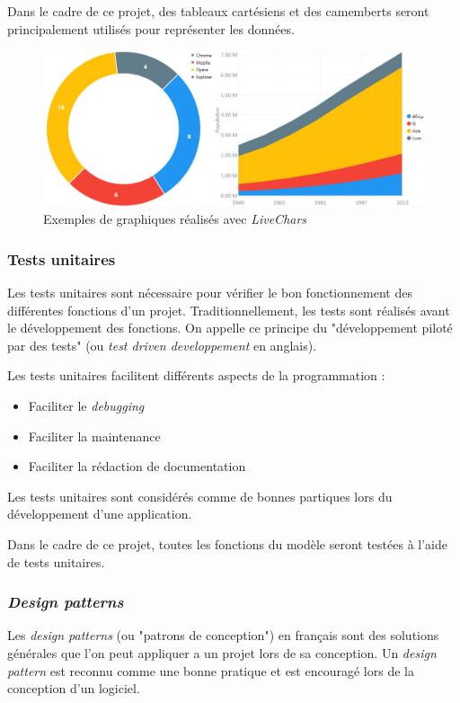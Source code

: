 \documentclass[a4paper]{article}
\begin{document}
Dans le cadre de ce projet, des tableaux cartésiens et des camemberts seront principalement utilisés pour représenter les données.

\vspace{0.5cm}
\begin{figure}[htp]
    \centering
    \includegraphics[width=\linewidth]{charts.png}
    \caption{Exemples de graphiques réalisés avec \textit{LiveChars}}
\end{figure}

\subsubsection{Tests unitaires}
Les tests unitaires sont nécessaire pour vérifier le bon fonctionnement des différentes fonctions d'un projet. Traditionnellement, les tests sont réalisés avant le développement des fonctions. On appelle ce principe du "développement piloté par des tests" (ou \textit{test driven developpement} en anglais). 

Les tests unitaires facilitent différents aspects de la programmation : 
\begin{itemize}
    \item Faciliter le \textit{debugging}
    \item Faciliter la maintenance
    \item Faciliter la rédaction de documentation
\end{itemize}

Les tests unitaires sont considérés comme de bonnes partiques lors du développement d'une application.

Dans le cadre de ce projet, toutes les fonctions du modèle seront testées à l'aide de tests unitaires.

\pagebreak
\subsubsection{\textit{Design patterns}}
Les \textit{design patterns} (ou "patrons de conception") en français sont des solutions générales que l'on peut appliquer a un projet lors de sa conception. Un \textit{design pattern} est reconnu comme une bonne pratique et est encouragé lors de la conception d'un logiciel.
\end{document}
